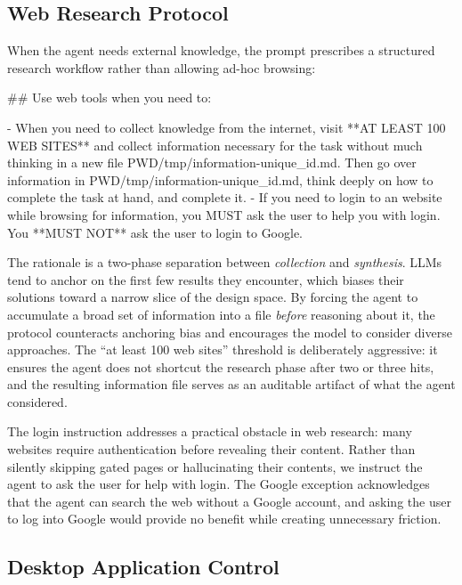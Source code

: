 \documentclass{article}
\begin{document}
\subsection{Web Research Protocol}

When the agent needs external knowledge, the prompt prescribes a
structured research workflow rather than allowing ad-hoc browsing:

\begin{prompt}
## Use web tools when you need to:

- When you need to collect knowledge from the internet,
  visit **AT LEAST 100 WEB SITES** and collect information
  necessary for the task without much thinking in a new
  file PWD/tmp/information-{unique_id}.md. Then go over
  information in PWD/tmp/information-{unique_id}.md, think
  deeply on how to complete the task at hand, and
  complete it.
- If you need to login to an website while browsing for
  information, you MUST ask the user to help you with
  login. You **MUST NOT** ask the user to login to Google.
\end{prompt}

\noindent The rationale is a two-phase separation between \emph{collection}
and \emph{synthesis}.  LLMs tend to anchor on the first few results
they encounter, which biases their solutions toward a narrow slice of
the design space.  By forcing the agent to accumulate a broad set of
information into a file \emph{before} reasoning about it, the protocol
counteracts anchoring bias and encourages the model to consider
diverse approaches.  The ``at least 100 web sites'' threshold is
deliberately aggressive: it ensures the agent does not shortcut the
research phase after two or three hits, and the resulting information
file serves as an auditable artifact of what the agent considered.

The login instruction addresses a practical obstacle in web research:
many websites require authentication before revealing their content.
Rather than silently skipping gated pages or hallucinating their
contents, we instruct the agent to ask the user for help with login.
The Google exception acknowledges that the agent can search the web
without a Google account, and asking the user to log into Google
would provide no benefit while creating unnecessary friction.

\subsection{Desktop Application Control}
\end{document}
